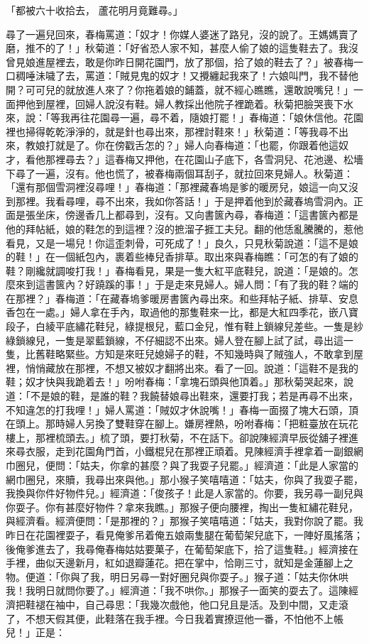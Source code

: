 \begin{showcontents}{}
「都被六十收拾去，  蘆花明月竟難尋。」

尋了一遍兒回來，春梅罵道：「奴才！你媒人婆迷了路兒，沒的說了。王媽媽賣了磨，推不的了！」秋菊道：「好省恐人家不知，甚麼人偷了娘的這隻鞋去了。我沒曾見娘進屋裡去，敢是你昨日開花園門，放了那個，拾了娘的鞋去了？」被春梅一口稠唾沬噦了去，罵道：「賊見鬼的奴才！又攪纏起我來了！六娘叫門，我不替他開？可可兒的就放進人來了？你拖着娘的鋪蓋，就不經心瞧瞧，還敢說嘴兒！」一面押他到屋裡，回婦人說沒有鞋。婦人教採出他院子裡跪着。秋菊把臉哭喪下水來，說：「等我再往花園尋一遍，尋不着，隨娘打罷！」春梅道：「娘休信他。花園裡也掃得乾乾淨淨的，就是針也尋出來，那裡討鞋來！」秋菊道：「等我尋不出來，教娘打就是了。你在傍戳舌怎的？」婦人向春梅道：「也罷，你跟着他這奴才，看他那裡尋去？」這春梅又押他，在花園山子底下，各雪洞兒、花池邊、松墻下尋了一遍，沒有。他也慌了，被春梅兩個耳刮子，就拉回來見婦人。秋菊道：「還有那個雪洞裡沒尋哩！」春梅道：「那裡藏春塢是爹的暖房兒，娘這一向又沒到那裡。我看尋哩，尋不出來，我如你答話！」于是押着他到於藏春塢雪洞內。正面是張坐床，傍邊香几上都尋到，沒有。又向書篋內尋，春梅道：「這書篋內都是他的拜帖紙，娘的鞋怎的到這裡？沒的摭溜子捱工夫兒。翻的他恁亂騰騰的，惹他看見，又是一場兒！你這歪刺骨，可死成了！」良久，只見秋菊說道：「這不是娘的鞋！」在一個紙包內，裹着些棒兒香排草。取出來與春梅瞧：「可怎的有了娘的鞋？剛纔就調唆打我！」春梅看見，果是一隻大紅平底鞋兒，說道：「是娘的。怎麼來到這書篋內？好蹺蹊的事！」于是走來見婦人。婦人問：「有了我的鞋？端的在那裡？」春梅道：「在藏春塢爹暖房書篋內尋出來。和些拜帖子紙、排草、安息香包在一處。」婦人拿在手內，取過他的那隻鞋來一比，都是大紅四季花，嵌八寶段子，白綾平底繡花鞋兒，綠提根兒，藍口金兒，惟有鞋上鎖線兒差些。一隻是紗綠鎖線兒，一隻是翠藍鎖線，不仔細認不出來。婦人登在腳上試了試，尋出這一隻，比舊鞋略緊些。方知是來旺兒媳婦子的鞋，不知幾時與了賊強人，不敢拿到屋裡，悄悄藏放在那裡，不想又被奴才翻將出來。看了一回。說道：「這鞋不是我的鞋；奴才快與我跪着去！」吩咐春梅：「拿塊石頭與他頂着。」那秋菊哭起來，說道：「不是娘的鞋，是誰的鞋？我饒替娘尋出鞋來，還要打我；若是再尋不出來，不知違怎的打我哩！」婦人罵道：「賊奴才休說嘴！」春梅一面掇了塊大石頭，頂在頭上。那時婦人另換了雙鞋穿在腳上。嫌房裡熱，吩咐春梅：「把粧臺放在玩花樓上，那裡梳頭去。」梳了頭，要打秋菊，不在話下。卻說陳經濟早辰從舖子裡進來尋衣服，走到花園角門首，小鐵棍兒在那裡正頑着。見陳經濟手裡拿着一副銀網巾圈兒，便問：「姑夫，你拿的甚麼？與了我耍子兒罷。」經濟道：「此是人家當的網巾圈兒，來贖，我尋出來與他。」那小猴子笑嘻嘻道：「姑夫，你與了我耍子罷，我換與你件好物件兒。」經濟道：「俊孩子！此是人家當的。你要，我另尋一副兒與你耍子。你有甚麼好物件？拿來我瞧。」那猴子便向腰裡，掏出一隻紅繡花鞋兒，與經濟看。經濟便問：「是那裡的？」那猴子笑嘻嘻道：「姑夫，我對你說了罷。我昨日在花園裡耍子，看見俺爹吊着俺五娘兩隻腿在葡萄架兒底下，一陣好風搖落；後俺爹進去了，我尋俺春梅姑姑要菓子，在葡萄架底下，拾了這隻鞋。」經濟接在手裡，曲似天邊新月，紅如退瓣蓮花。把在掌中，恰剛三寸，就知是金蓮腳上之物。便道：「你與了我，明日另尋一對好圈兒與你耍子。」猴子道：「姑夫你休哄我！我明日就問你要了。」經濟道：「我不哄你。」那猴子一面笑的耍去了。這陳經濟把鞋褪在袖中，自己尋思：「我幾次戲他，他口兒且是活。及到中間，又走滾了，不想天假其便，此鞋落在我手裡。今日我着實撩逗他一番，不怕他不上帳兒！」正是：


\end{showcontents}

